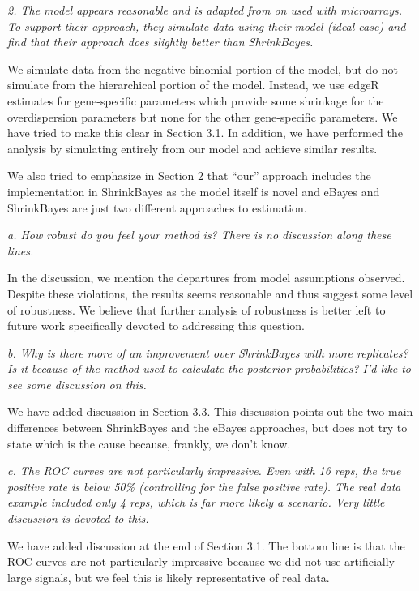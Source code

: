 \documentclass{article}
\newcommand{\comment}[1]{\textit{#1}}
\newcommand{\response}[1]{#1}
\begin{document}
\comment{2. The model appears reasonable and is adapted from on used with microarrays.  To support their approach, they simulate data using their model (ideal case) and find that their approach does slightly better than ShrinkBayes.}

\response{We simulate data from the negative-binomial portion of the model, but do not simulate from the hierarchical portion of the model. Instead, we use edgeR estimates for gene-specific parameters which provide some shrinkage for the overdispersion parameters but none for the other gene-specific parameters. We have tried to make this clear in Section 3.1. In addition, we have performed the analysis by simulating entirely from our model and achieve similar results.}

\response{We also tried to emphasize in Section 2 that ``our'' approach includes the implementation in ShrinkBayes as the model itself is novel and eBayes and ShrinkBayes are just two different approaches to estimation.}

\comment{a. How robust do you feel your method is?  There is no discussion along these lines.}

\response{In the discussion, we mention the departures from model assumptions observed. Despite these violations, the results seems reasonable and thus suggest some level of robustness. We believe that further analysis of robustness is better left to future work specifically devoted to addressing this question.}

\comment{b.      Why is there more of an improvement over ShrinkBayes with more replicates?  Is it because of the method used to calculate the posterior probabilities?  I'd like to see some discussion on this.}

\response{We have added discussion in Section 3.3. This discussion points out the two main differences between ShrinkBayes and the eBayes approaches, but does not try to state which is the cause because, frankly, we don't know.}

\comment{c.      The ROC curves are not particularly impressive.  Even with 16 reps, the true positive rate is below 50\% (controlling for the false positive rate).  The real data example included only 4 reps, which is far more likely a scenario.  Very little discussion is devoted to this.}

\response{We have added discussion at the end of Section 3.1. The bottom line is that the ROC curves are not particularly impressive because we did not use artificially large signals, but we feel this is likely representative of real data.}
\end{document}
